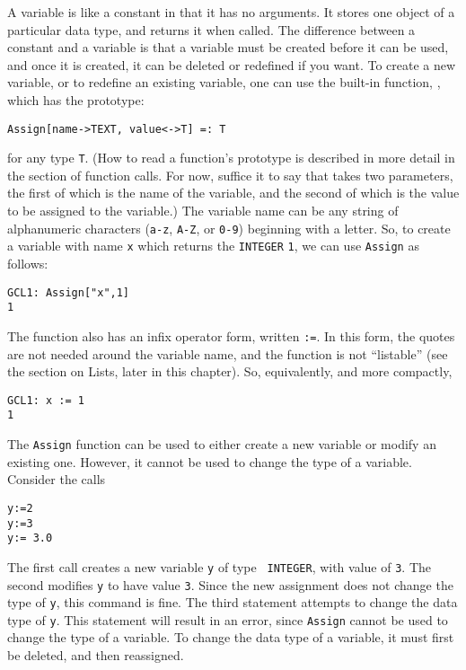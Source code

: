 A variable is like a constant in that it has no arguments.  It stores
one object of a particular data type, and returns it when called. The
difference between a constant and a variable is that a variable must
be created before it can be used, and once it is created, it can be
deleted or redefined if you want.  To create a new variable, or to
redefine an existing variable, one can use the built-in function,
, which has the prototype:
\begin{verbatim}
Assign[name->TEXT, value<->T] =: T
\end{verbatim}
\noindent 
for any type \verb+T+.  (How to read a function's prototype is
described in more detail in the section of function calls.  For now,
suffice it to say that  takes two parameters, the first of
which is the name of the variable, and the second of which is the
value to be assigned to the variable.)  The variable name can be any
string of alphanumeric characters (\verb+a-z+, \verb+A-Z+, or
\verb+0-9+) beginning with a letter.  So, to create a variable with
name \verb+x+ which returns the \verb+INTEGER+ \verb+1+, we can use
\verb+Assign+ as follows:

\begin{verbatim}
GCL1: Assign["x",1]
1
\end{verbatim}


\noindent 
The  function also has an infix operator form, written
{\tt :=}.  In this form, the quotes are not needed around the variable
name, and the function is not ``listable'' (see the section on Lists,
later in this chapter).  So, equivalently, and more compactly,

\begin{verbatim}
GCL1: x := 1
1
\end{verbatim}

The {\tt Assign} function can be used to either create a new variable or
modify an existing one.  However, it cannot be used to change the type
of a variable.  Consider the calls

\begin{verbatim}
y:=2
y:=3
y:= 3.0
\end{verbatim}

\noindent The first call creates a new variable {\tt y} of type {\tt
INTEGER}, with value of \verb+3+.  The second modifies \verb+y+ to
have value \verb+3+.  Since the new assignment does not change the
type of \verb+y+, this command is fine.  The third statement attempts
to change the data type of \verb+y+.  This statement will result in an
error, since {\tt Assign} cannot be used to change the type of a
variable.  To change the data type of a variable, it must first be
deleted, and then reassigned.  

